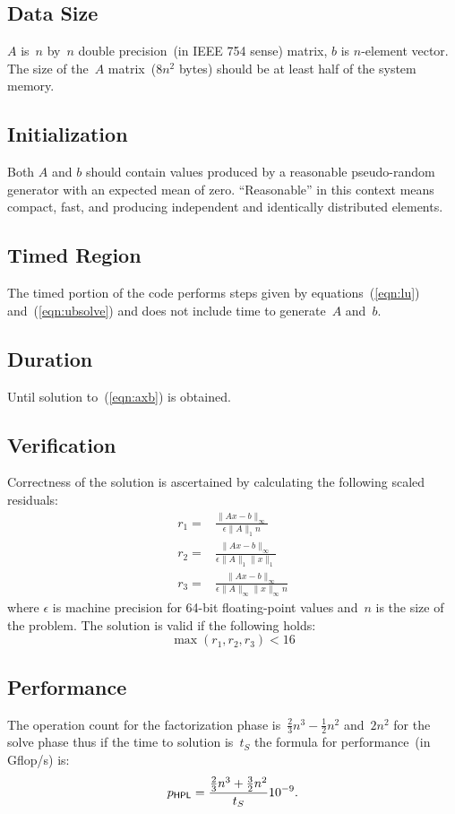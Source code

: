 \documentclass[twocolumn]{article}
\newcommand{\hpl}{\textsf{\scriptsize HPL}\xspace}
\begin{document}
\subsection{Data Size}
$A$ is~$n$ by~$n$ double precision~(in IEEE 754 sense) matrix, $b$ is
$n$-element vector. The size of the~$A$ matrix~($8n^2$ bytes) should be at
least half of the system memory.

\subsection{Initialization}
Both $A$ and $b$ should contain values produced by a reasonable pseudo-random
generator with an expected mean of zero. ``Reasonable'' in this context means
compact, fast, and producing independent and identically distributed elements.

\subsection{Timed Region}
The timed portion of the code performs steps given by equations~(\ref{eqn:lu})
and~(\ref{eqn:ubsolve}) and does not include time to generate~$A$ and~$b$.

\subsection{Duration}
Until solution to~(\ref{eqn:axb}) is obtained.

\subsection{Verification}
Correctness of the solution is ascertained by calculating the following scaled
residuals:
\begin{eqnarray}
r_1 = & \frac{\|Ax-b\|_{\infty}}{\epsilon \|A\|_1 n} \\
r_2 = &\frac{\|Ax-b\|_{\infty}}{\epsilon \|A\|_1 \|x\|_1} \\
r_3 = &\frac{\|Ax-b\|_{\infty}}{\epsilon \|A\|_{\infty} \|x\|_{\infty} n}
\end{eqnarray}
where $\epsilon$ is machine precision for 64-bit floating-point values and~$n$
is the size of the problem. The solution is valid if the following holds:
\begin{equation}
  \max(r_1, r_2, r_3) < 16
\end{equation}

\subsection{Performance}
The operation count for the factorization phase
is~$\frac{2}{3}n^3-\frac{1}{2}n^2$ and~$2n^2$ for the solve phase thus if the
time to solution is~$t_S$ the formula for performance~(in Gflop/s) is:
\begin{equation}
  p_{\hpl}=\frac{\frac{2}{3}n^3+\frac{3}{2}n^2}{t_S}10^{-9}.
\end{equation}
\end{document}
